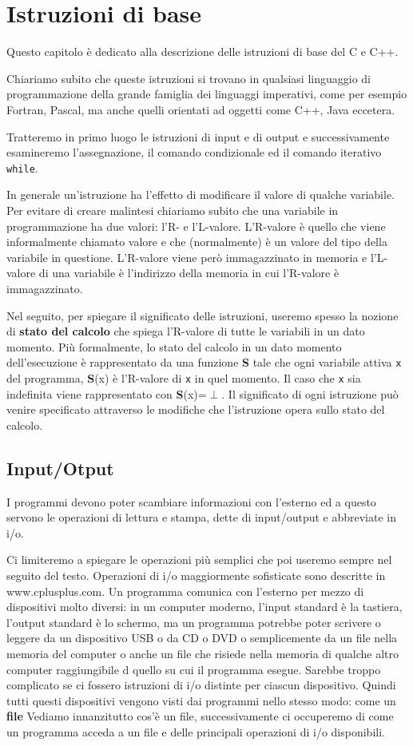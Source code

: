 
\chapter{Istruzioni di base}
Questo capitolo è dedicato alla descrizione delle istruzioni di base del C e C++.

\noindent Chiariamo subito che queste istruzioni si trovano in qualsiasi linguaggio di programmazione della grande famiglia dei linguaggi imperativi, come per esempio Fortran, Pascal, ma anche quelli orientati ad oggetti come C++, Java eccetera.

\noindent Tratteremo in primo luogo le istruzioni di input e di output e successivamente esamineremo l'assegnazione, il comando condizionale ed il comando iterativo \texttt{while}.

In generale un'istruzione ha l'effetto di modificare il valore di qualche variabile.
Per evitare di creare malintesi chiariamo subito che una variabile in programmazione ha due valori: l'R- e l'L-valore.
L'R-valore è quello che viene informalmente chiamato valore e che (normalmente) è un valore del tipo della variabile in questione.
L'R-valore viene però immagazzinato in memoria e l'L-valore di una variabile è l'indirizzo della memoria in cui l'R-valore è immagazzinato.

Nel seguito, per spiegare il significato delle istruzioni, useremo spesso la nozione di \textbf{stato del calcolo} che spiega l'R-valore di tutte le variabili in un dato momento.
Più formalmente, lo stato del calcolo in un dato momento dell'esecuzione è rappresentato da una funzione \textbf{S} tale che ogni variabile attiva \texttt{x} del programma, \textbf{S}(x) è l'R-valore di \texttt{x} in quel momento.
Il caso che \texttt{x} sia indefinita viene rappresentato con \textbf{S}(x)=$\perp$.
Il significato di ogni istruzione può venire specificato attraverso le modifiche che l'istruzione opera sullo stato del calcolo.

\section{Input/Otput}
I programmi devono poter scambiare informazioni con l'esterno ed a questo servono le operazioni di lettura e stampa, dette di input/output e abbreviate in i/o.

\noindent Ci limiteremo a spiegare le operazioni più semplici che poi useremo sempre nel seguito del testo.
Operazioni di i/o maggiormente sofisticate sono descritte in www.cplusplus.com.
Un programma comunica con l'esterno per mezzo di dispositivi molto diversi: in un computer moderno, l'input standard è la tastiera, l'output standard è lo schermo, ma un programma potrebbe poter scrivere o leggere da un dispositivo USB o da CD o DVD o semplicemente da un file nella memoria del computer o anche un file che risiede nella memoria di qualche altro computer raggiungibile d quello su cui il programma esegue.
Sarebbe troppo complicato se ci fossero istruzioni di i/o distinte per ciascun dispositivo.
Quindi tutti questi dispositivi vengono visti dai programmi nello stesso modo: come un \textbf{file}
Vediamo innanzitutto cos'è un file, successivamente ci occuperemo di come un programma acceda a un file e delle principali operazioni di i/o disponibili.

